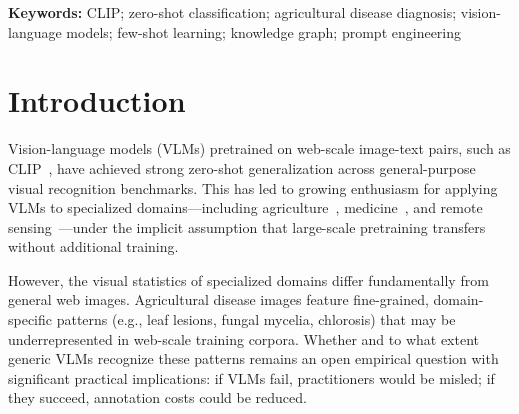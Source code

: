 \documentclass[10pt,a4paper]{article}
\begin{document}
\begin{abstract}
The cross-crop check reproduces the protocol-dependent pattern: fine-tuned ResNet-18 leads the frozen CLIP probe at $K{\geq}5$ on both crops, and the $K{=}1$ contrast is a tie within noise on both (tomato 44.7\% vs.\ 45.5\%; corn 76.8\% vs.\ 76.2\%); the two crops are reported separately rather than pooled, because PlantVillage's shared collection pipeline makes their errors non-independent and they should not be treated as independent evidence.
Readout geometry was checkpoint-dependent: on LAION-2B the patch tokens carry additional signal the CLS readout misses (mean-pool $+10.9$\,pp at $C{=}1$; though CLS at $C{=}100$ reaches 87.7\%, so the gain is $C$-dependent, not unconditional).
A field-condition evaluation (246 images, 19 classes) shows the fine-tuned ranking reverses under field conditions (ResNet-18 leads CLIP by 6.9\,pp), consistent with, but not attributable to, an image-style effect.
Practically: zero-shot CLIP should not be deployed for this task; the frozen and fine-tuned arms should be chosen by the binding constraint---iteration cost and reproducibility, accuracy, or inference cost. All code, data, and scripts are available in the repository cited in the Data Availability Statement.
\end{abstract}

\noindent\textbf{Keywords:} CLIP; zero-shot classification; agricultural disease diagnosis; vision-language models; few-shot learning; knowledge graph; prompt engineering



\section{Introduction}
\label{sec:intro}

Vision-language models (VLMs) pretrained on web-scale image-text pairs, such as CLIP~\cite{radford2021learning}, have achieved strong zero-shot generalization across general-purpose visual recognition benchmarks.
This has led to growing enthusiasm for applying VLMs to specialized domains---including agriculture~\cite{pdclip2026}, medicine~\cite{huang2021gloria}, and remote sensing~\cite{liu2024remoteclip}---under the implicit assumption that large-scale pretraining transfers without additional training.

However, the visual statistics of specialized domains differ fundamentally from general web images.
Agricultural disease images feature fine-grained, domain-specific patterns (e.g., leaf lesions, fungal mycelia, chlorosis) that may be underrepresented in web-scale training corpora.
Whether and to what extent generic VLMs recognize these patterns remains an open empirical question with significant practical implications: if VLMs fail, practitioners would be misled; if they succeed, annotation costs could be reduced.
\end{document}
